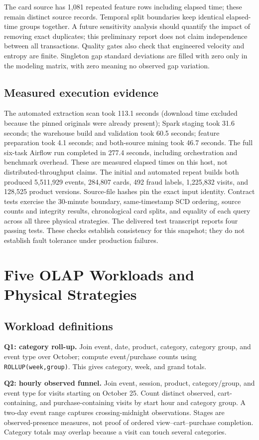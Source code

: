 \documentclass[conference]{IEEEtran}
\newcommand{\code}[1]{\texttt{\small #1}}
\begin{document}
The card source has 1,081 repeated feature rows including elapsed time; these remain distinct source records. Temporal split boundaries keep identical elapsed-time groups together. A future sensitivity analysis should quantify the impact of removing exact duplicates; this preliminary report does not claim independence between all transactions. Quality gates also check that engineered velocity and entropy are finite. Singleton gap standard deviations are filled with zero only in the modeling matrix, with zero meaning no observed gap variation.

\subsection{Measured execution evidence}
The automated extraction scan took 113.1 seconds (download time excluded because the pinned originals were already present); Spark staging took 31.6 seconds; the warehouse build and validation took 60.5 seconds; feature preparation took 4.1 seconds; and both-source mining took 46.7 seconds. The full six-task Airflow run completed in 277.4 seconds, including orchestration and benchmark overhead. These are measured elapsed times on this host, not distributed-throughput claims.
The initial and automated repeat builds both produced 5,511,929 events, 284,807 cards, 492 fraud labels, 1,225,832 visits, and 128,525 product versions. Source-file hashes pin the exact input identity. Contract tests exercise the 30-minute boundary, same-timestamp SCD ordering, source counts and integrity results, chronological card splits, and equality of each query across all three physical strategies. The delivered test transcript reports four passing tests. These checks establish consistency for this snapshot; they do not establish fault tolerance under production failures.

\section{Five OLAP Workloads and Physical Strategies}
\subsection{Workload definitions}
\textbf{Q1: category roll-up.} Join event, date, product, category, category group, and event type over October; compute event/purchase counts using \code{ROLLUP(week,group)}. This gives category, week, and grand totals.

\textbf{Q2: hourly observed funnel.} Join event, session, product, category/group, and event type for visits starting on October 25. Count distinct observed, cart-containing, and purchase-containing visits by start hour and category group. A two-day event range captures crossing-midnight observations. Stages are observed-presence measures, not proof of ordered view--cart--purchase completion. Category totals may overlap because a visit can touch several categories.
\end{document}
